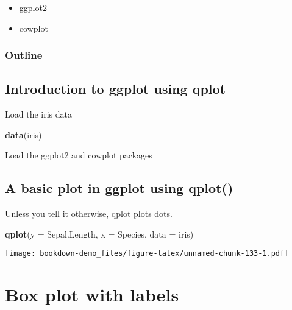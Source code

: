 \documentclass[]{book}
\newenvironment{Shaded}{\begin{snugshade}}{\end{snugshade}}
\newcommand{\KeywordTok}[1]{\textcolor[rgb]{0.13,0.29,0.53}{\textbf{#1}}}
\newcommand{\DataTypeTok}[1]{\textcolor[rgb]{0.13,0.29,0.53}{#1}}
\newcommand{\NormalTok}[1]{#1}
\providecommand{\tightlist}{%
  \setlength{\itemsep}{0pt}\setlength{\parskip}{0pt}}
\theoremstyle{definition}
\theoremstyle{definition}
\theoremstyle{definition}
\theoremstyle{remark}
\begin{document}
\begin{itemize}
\tightlist
\item
  ggplot2
\item
  cowplot
\end{itemize}

\subsection{Outline}\label{outline-1}

\section{Introduction to ggplot using
qplot}\label{introduction-to-ggplot-using-qplot}

Load the iris data

\begin{Shaded}
\begin{Highlighting}[]
\KeywordTok{data}\NormalTok{(iris)}
\end{Highlighting}
\end{Shaded}

Load the ggplot2 and cowplot packages

\section{A basic plot in ggplot using
qplot()}\label{a-basic-plot-in-ggplot-using-qplot}

Unless you tell it otherwise, qplot plots dots.

\begin{Shaded}
\begin{Highlighting}[]
\KeywordTok{qplot}\NormalTok{(}\DataTypeTok{y =}\NormalTok{ Sepal.Length,}
      \DataTypeTok{x =}\NormalTok{ Species,    }
        \DataTypeTok{data =}\NormalTok{ iris) }
\end{Highlighting}
\end{Shaded}

\texttt{[image: bookdown-demo\_files/figure-latex/unnamed-chunk-133-1.pdf]}

\chapter{Box plot with labels}\label{box-plot-with-labels}
\end{document}
